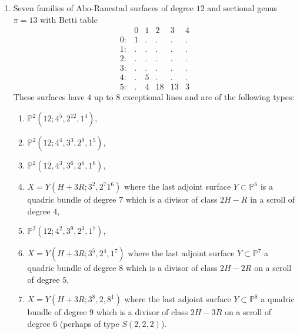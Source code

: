 \documentclass[twoside,12pt, leqno]{amsart}
\def\PP{{\mathbb P}}
\begin{document}
\begin{enumerate}
\item\label{ARsurf} Seven families of Abo-Ranestad surfaces of degree $12$ and sectional genus $\pi=13$ with Betti table
$$\begin{matrix}
       & 0 & 1 & 2 & 3 & 4\\
      0: & 1 & . & . & . & .\\
      1: & . & . & . & . & .\\
      2: & . & . & . & . & .\\
      3: & . & . & . & . & .\\
      4: & . & 5 & . & . & .\\
      5: & . & 4 & 18 & 13 & 3
      \end{matrix}$$
These surfaces have $4$ up to $8$ exceptional lines and are of the following types:
\begin{enumerate}
\item\label{ARsurfa}  $\PP^{2}(12;4^{5},2^{12},1^{4})$,
\item  $\PP^{2}(12;4^{4},3^{3},2^{9},1^{5})$,
\item $\PP^{2}(12,4^{3},3^{6},2^{6},1^{6})$,
 \item $X=Y(H+3R;3^{2},2^{7}1^{6})$ where the last adjoint surface $Y \subset \PP^{6}$ is a quadric bundle of degree $7$ which is a divisor of class $2H-R$ in a scroll of degree $4$, 
\item $\PP^{2}(12;4^{2},3^{9},2^{3},1^{7})$, 
\item  $X=Y(H+3R;3^{5},2^{4},1^{7})$ where the last adjoint surface $Y\subset \PP^{7}$ a quadric bundle of degree $8$ which is a divisor  of class $2H-2R$ on a scroll of degree $5$,
\item $X=Y(H+3R;3^{8},2,8^{1})$
where the last adjoint surface $Y \subset \PP^{8}$ a quadric bundle of degree $9$ which is  a divisor  of class $2H-3R$ on a scroll of degree $6$ (perhaps of type $S(2,2,2)$).
\end{enumerate}


\end{enumerate}
\end{document}
